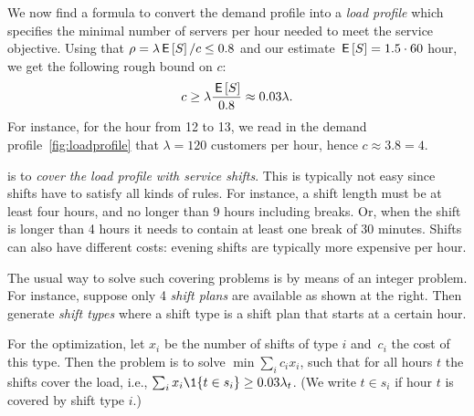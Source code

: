 We now find a formula to convert the demand profile into a \emph{load profile} which specifies the minimal number of servers per hour needed to meet the service objective.
Using that $\rho = \lambda \,\mathsf{E}\left[S\right]/c \leq 0.8 $ and our estimate $\,\mathsf{E}\left[S\right]=1.5\cdot 60$ hour, we get the following rough bound on $c$:
\begin{equation*}
c \geq \lambda \frac{\,\mathsf{E}\left[S\right]}{0.8} \approx 0.03 \lambda.
\end{equation*}
For instance, for the hour from 12 to 13, we read in the demand profile~\cref{fig:loadprofile} that $\lambda= 120$ customers per hour, hence $c\approx 3.8 = 4$.

 is to \emph{cover the load profile with service shifts}.
This is typically not easy since shifts have to satisfy all kinds of rules.
For instance, a shift length must be at least four hours, and no longer than 9 hours including breaks.
Or, when the shift is longer than 4 hours it needs to contain at least one break of 30 minutes.
Shifts can also have different costs: evening shifts are typically  more expensive per hour.

The usual way to solve such covering problems is by means of an integer
problem. For instance, suppose only 4 \emph{shift plans} are available as shown at the right.
Then generate \emph{shift types} where a shift type is a shift plan that starts at a certain hour. 

For the optimization, let $x_i$ be the number of shifts of type $i$ and~$c_i$ the cost of this type.
Then the problem is to solve $\min \sum_i c_i x_i$, 
such that for all hours $t$ the shifts cover the load, i.e., $\sum_i x_i \1{t \in s_i} \geq 0.03 \lambda_t$.
(We write $t\in s_i$ if hour $t$ is covered by shift type $i$.)

